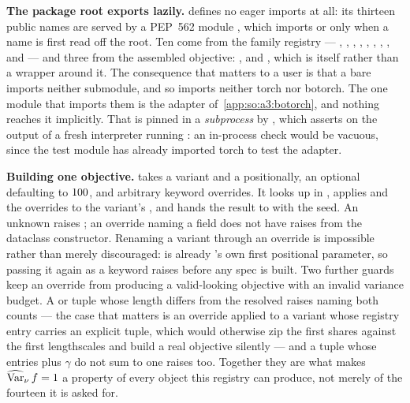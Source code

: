 \label{app:so:a3}

\label{app:so:a3:api}

\textbf{The package root exports lazily.} 
defines no eager imports at all: its thirteen public names are served by a
PEP~562 module , which imports 
or  only when a name is first read off the root. Ten
come from the family registry --- , ,
, , , ,
, ,  and
 --- and three from the assembled objective:
,  and , which is
 itself rather than a wrapper around it. The
consequence that matters to a user is that a bare 
imports neither submodule, and so imports neither torch nor botorch. The one
module that imports them is the adapter of~\ref{app:so:a3:botorch}, and nothing
reaches it implicitly. That is pinned in a
\emph{subprocess} by
, which asserts on the
output of a fresh interpreter running : an
in-process check would be vacuous, since the test module has already imported
torch to test the adapter.

\textbf{Building one objective.}  takes a variant
 and a  positionally, an optional 
defaulting to $100$, and arbitrary keyword overrides. It looks
 up in , applies  and the overrides to
the variant's , and hands the result to  with
the seed. An unknown  raises ;
an override naming a field  does not have raises
 from the dataclass constructor. Renaming a variant through
an override is impossible rather than merely discouraged:  is
already 's own first positional parameter, so passing it
again as a keyword raises  before any spec is
built. Two further guards keep an override from producing a valid-looking
objective with an invalid variance budget. A  or 
tuple whose length differs from the resolved  raises
 naming both counts --- the case that matters is an
 override applied to a variant whose registry entry carries an
explicit tuple, which would otherwise zip the first  shares
against the first  lengthscales and build a real objective
silently --- and a  tuple whose entries plus $\gamma$ do not sum
to one raises  too. Together they are what makes
$\operatorname{\widehat{\mathrm{Var}}}_\nu f=1$ a property of every object this registry can produce, not merely
of the fourteen it is asked for.

